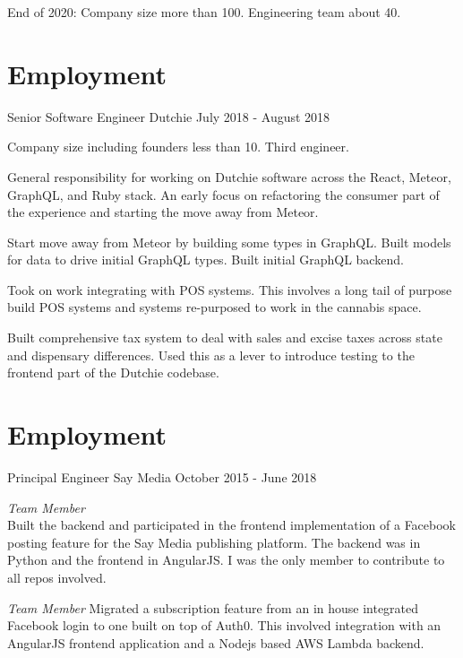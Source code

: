 \documentclass[margin]{res}
\begin{document}
\begin{resume}
                End of 2020: Company size more than 100.  Engineering team about 40.

    \section{Employment} {Senior Software Engineer Dutchie \hfill July 2018 - August 2018}

                Company size including founders less than 10.  Third engineer.

                General responsibility for working on Dutchie software across
                the React, Meteor, GraphQL, and Ruby stack.  An early focus on
                refactoring the consumer part of the experience and starting the move away
                from Meteor.

                Start move away from Meteor by building some types in GraphQL.  Built models
                for data to drive initial GraphQL types.
                Built initial GraphQL backend.

                Took on work integrating with POS systems.  This involves a long tail of
                purpose build POS systems and systems re-purposed to work in the cannabis
                space.

                Built comprehensive tax system to deal with sales and excise taxes across
                state and dispensary differences.  Used this as a lever to introduce testing
                to the frontend part of the Dutchie codebase.

    \section{Employment} {Principal Engineer Say Media \hfill October 2015 - June 2018}

                \emph{Team Member}\\
                Built the backend and participated in the frontend implementation of
                a Facebook posting feature for the Say Media publishing platform.  The backend was
                in Python and the frontend in AngularJS.  I was the only member to contribute
                to all repos involved.

                \emph{Team Member} Migrated a subscription feature from an in house integrated Facebook login
                to one built on top of Auth0.  This involved integration with an AngularJS frontend
                application and a Nodejs based AWS Lambda backend.


\end{resume}
\end{document}
